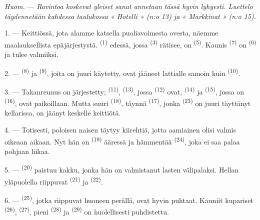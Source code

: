 \textit{Huom.} --- \textit{Ravintoa koskevat yleiset sanat annetaan tässä hyvin
lyhyesti. Luettelo täydennetään kahdessa taulukossa « Hotelli » (n:o 13) ja
« Markkinat » (n:o 15).}

\VUsaut{4.6mm}
\VUsaut{3.0mm}

1. --- Keittiössä, jota alamme katsella puoliavoimesta ovesta, näemme
maalauksellista epäjärjestystä.  \textsuperscript{(1)} edessä,
jossa  \textsuperscript{(3)} rätisee, on 
\textsuperscript{(5)}. Kaunis  \textsuperscript{(7)} on
 \textsuperscript{(6)} ja tulee valmiiksi.

2. ---  \textsuperscript{(8)} ja 
\textsuperscript{(9)}, joita on juuri käytetty, ovat jääneet lattialle samoin
kuin  \textsuperscript{(10)}.

3. --- Takanreunus on järjestetty;  \textsuperscript{(11)},
 \textsuperscript{(13)}, jossa 
\textsuperscript{(12)} ovat,  \textsuperscript{(14)} ja
 \textsuperscript{(15)}, jossa on 
\textsuperscript{(16)}, ovat paikoillaan. Mutta suuri 
\textsuperscript{(18)}, täynnä  \textsuperscript{(17)}, jonka
 \textsuperscript{(23)} on juuri täyttänyt kellarissa, on
jäänyt keskelle keittiötä.

4. --- Totisesti, poloisen naisen täytyy kiirehtiä, jotta aamiainen olisi valmis
oikeaan aikaan. Nyt hän on  \textsuperscript{(19)} ääressä ja
hämmentää  \textsuperscript{(24)}, joka ei saa palaa pohjaan
liikaa.

5. ---  \textsuperscript{(20)} paistuu kakku, jonka hän on
valmistanut lasten välipalaksi. Hellan yläpuolella riippuvat 
\textsuperscript{(21)} ja  \textsuperscript{(22)}.

\VUsaut{4.0mm}
\VUsaut{3.0mm}

6. ---  \textsuperscript{(25)}, jotka riippuvat huoneen
perällä, ovat hyvin puhtaat. Kauniit kupariset 
\textsuperscript{(26)},  \textsuperscript{(27)}, pieni
 \textsuperscript{(28)} ja 
\textsuperscript{(29)} on huolellisesti puhdistettu.


